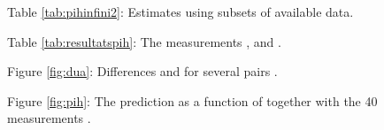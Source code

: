 \documentclass[a4paper,12pt]{article}
\begin{document}
\noindent Table \ref{tab:pihinfini2}: 
Estimates \coordHE{} using subsets of available data.

\noindent Table \ref{tab:resultatspih}:
The measurements \coordHE{}, \coordHE{} and \coordHE{}.

\noindent Figure \ref{fig:dua}: Differences \coordHE{} and
\coordHE{} for several pairs
\coordHE{}.

\noindent Figure \ref{fig:pih}: The prediction \coordHE{} as a function of \coordHE{} together
with the 40 measurements \coordHE{}.
\end{document}
